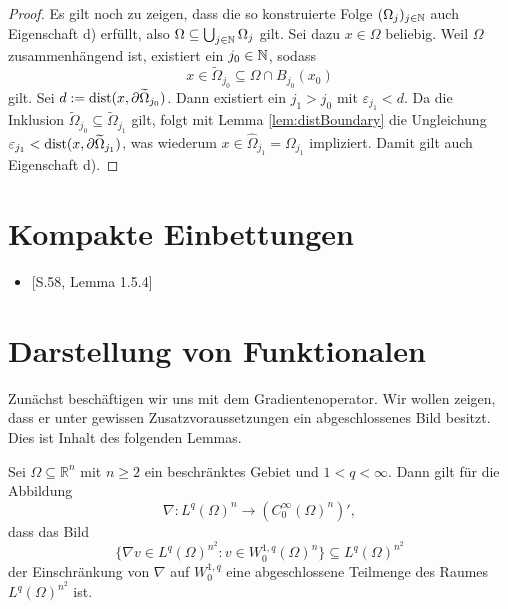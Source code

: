 \begin{proof}
  Es gilt noch zu zeigen, dass die so konstruierte Folge $(\Omega_j)_{j \in \mathbb{N}}$ auch Eigenschaft d) erfüllt, also $ \Omega \subseteq \bigcup_{j \in \mathbb{N}} \Omega_j $ gilt.
  Sei dazu $x \in \Omega$ beliebig.
  Weil $\Omega$ zusammenhängend ist, existiert ein $j_0 \in \mathbb{N}$, sodass
  $$
  x \in \widetilde\Omega_{j_0} \subseteq \Omega \cap B_{j_0}(x_0)
  $$
  gilt.
  Sei $d:=\operatorname{dist}(x, \partial\widetilde\Omega_{j_0})$.
  Dann existiert ein $j_1 > j_0$ mit $\varepsilon_{j_1} < d$.
  Da die Inklusion $\widetilde\Omega_{j_0} \subseteq \widetilde\Omega_{j_1}$ gilt, folgt mit Lemma \ref{lem:distBoundary} die Ungleichung $\varepsilon_{j_1} < \operatorname{dist}(x,\partial\widetilde\Omega_{j_1})$, was wiederum $x \in \widehat\Omega_{j_1} = \Omega_{j_1}$ impliziert.
  Damit gilt auch Eigenschaft d).
\end{proof}

\section{Kompakte Einbettungen}

\begin{itemize}
  \item \cite{sohr2001navier}[S.58, Lemma 1.5.4]
\end{itemize}

\newpage
\section{Darstellung von Funktionalen}

Zunächst beschäftigen wir uns mit dem Gradientenoperator.
Wir wollen zeigen, dass er unter gewissen Zusatzvoraussetzungen ein abgeschlossenes Bild besitzt.
Dies ist Inhalt des folgenden Lemmas.

\begin{lem}
  \label{lem:closedImageGradient}
  Sei $\Omega \subseteq \mathbb{R}^n$ mit $n \geq 2$ ein beschränktes Gebiet und $1 < q < \infty$.
  Dann gilt für die Abbildung
  $$
  \nabla \colon L^{q}(\Omega)^{n} \to (C_0^\infty(\Omega)^n)',
  $$
  dass das Bild
  $$
  \{\nabla v \in L^{q}(\Omega)^{n^2} \colon v \in W_0^{1,q}(\Omega)^n\} \subseteq L^{q}(\Omega)^{n^2}
  $$
  der Einschränkung von $\nabla$ auf $W_0^{1,q}$ eine abgeschlossene Teilmenge des Raumes $L^q(\Omega)^{n^2}$ ist.
\end{lem}

